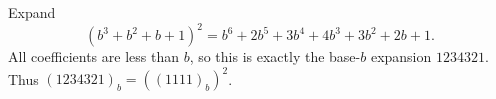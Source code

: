 Expand
\[
(b^3+b^2+b+1)^2=b^6+2b^5+3b^4+4b^3+3b^2+2b+1.
\]
All coefficients are less than $b$, so this is exactly the base-$b$ expansion $1234321$. Thus $(1234321)_b=((1111)_b)^2$.

